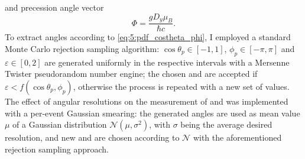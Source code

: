 and precession angle vector
\begin{equation}
\Phi
=
\frac{g D_y \mu_B}{\hbar c}
.
\end{equation}
To extract angles according to \eqref{eq:5:pdf_costheta_phi}, I employed a standard Monte Carlo rejection sampling algorithm: $\cos\theta_p \in [-1,1]$, $\phi_p \in [-\pi,\pi]$ and $\varepsilon \in [0,2]$ are generated uniformly in the respective intervals with a Mersenne Twister pseudorandom number engine; the chosen \cthetap and \phip are accepted if $\varepsilon < f(\cos\theta_p, \phi_p)$, otherwise the process is repeated with a new set of values.
The effect of angular resolutions on the measurement of \cthetap and \phip was implemented with a per-event Gaussian smearing:
the generated angles are used as mean value $\mu$ of a Gaussian distribution $\mathcal{N}(\mu,\sigma^2)$, with $\sigma$ being the average desired resolution, and new \cthetap and \phip are chosen according to $\mathcal{N}$ with the aforementioned rejection sampling approach.

